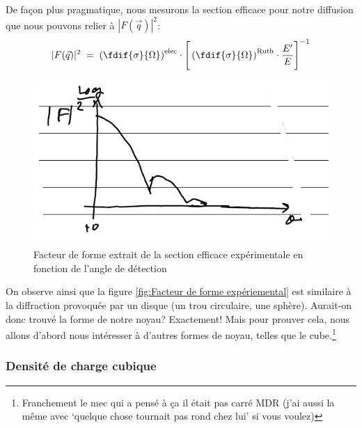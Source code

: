 De façon plus pragmatique, nous mesurons la section efficace pour notre diffusion que nous pouvons relier à $|F(\vec{q})|^2$:
\[
    |F(\vec{q})|^2 \eq
    \left( \fdif{\sigma}{\Omega} \right)^\text{elec}
    \cdot
    \Bigg[
    \left( \fdif{\sigma}{\Omega} \right)^\text{Ruth}
    \cdot \dfrac{E'}{E}
    \Bigg]^{-1}
\]
\begin{figure}[H]
    \centering
    \includegraphics[scale=0.80]{Images4/graphe 2.PNG}
    \caption{Facteur de forme extrait de la section efficace expérimentale en fonction de l'angle de détection}
    \label{fig:Facteur de forme expériemental}
\end{figure}
On observe ainsi que la figure \eqref{fig:Facteur de forme expériemental} est similaire à la diffraction provoquée par un disque (un trou circulaire, une sphère). Aurait-on donc trouvé la forme de notre noyau? Exactement! Mais pour prouver cela, nous allons d'abord nous intéresser à d'autres formes de noyau, telles que le cube.\footnote{Franchement le mec qui a pensé à ça il était pas carré MDR (j'ai aussi la même avec `quelque chose tournait pas rond chez lui' si vous voulez)}



\subsubsection{Densité de charge cubique}

